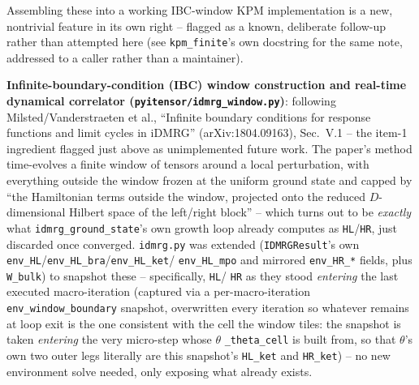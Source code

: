 \documentclass[11pt]{article}
\begin{document}
Assembling these into a working IBC-window KPM implementation is a
new, nontrivial feature in its own right -- flagged as a known,
deliberate follow-up rather than attempted here (see
\texttt{kpm\_finite}'s own docstring for the same note, addressed to a
caller rather than a maintainer).

\textbf{Infinite-boundary-condition (IBC) window construction and
real-time dynamical correlator
(\texttt{pyitensor/idmrg\_window.py})}: following Milsted/Vanderstraeten
et al., ``Infinite boundary conditions for response functions and limit
cycles in iDMRG'' (arXiv:1804.09163), Sec.~V.1 -- the item-1 ingredient
flagged just above as unimplemented future work. The paper's method
time-evolves a finite window of tensors around a local perturbation,
with everything outside the window frozen at the uniform ground state
and capped by ``the Hamiltonian terms outside the window, projected
onto the reduced $D$-dimensional Hilbert space of the left/right
block'' -- which turns out to be \emph{exactly} what
\texttt{idmrg\_ground\_state}'s own growth loop already computes as
\texttt{HL}/\texttt{HR}, just discarded once converged.
\texttt{idmrg.py} was extended (\texttt{IDMRGResult}'s own
\texttt{env\_HL}/\texttt{env\_HL\_bra}/\texttt{env\_HL\_ket}/
\texttt{env\_HL\_mpo} and mirrored \texttt{env\_HR\_*} fields, plus
\texttt{W\_bulk}) to snapshot these -- specifically, \texttt{HL}/
\texttt{HR} as they stood \emph{entering} the last executed
macro-iteration (captured via a per-macro-iteration
\texttt{env\_window\_boundary} snapshot, overwritten every iteration so
whatever remains at loop exit is the one consistent with the
cell the window tiles: the snapshot is taken \emph{entering} the very
micro-step whose $\theta$ \texttt{\_theta\_cell} is built from, so that
$\theta$'s own two outer legs literally are this snapshot's
\texttt{HL\_ket} and \texttt{HR\_ket}) -- no new environment solve
needed, only exposing what already exists.
\end{document}
